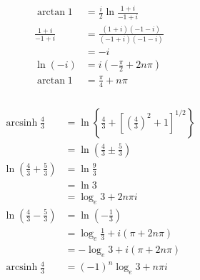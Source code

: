 \documentclass{article}
\newcommand{\arcsinh}{\operatorname{arcsinh}}
\begin{document}
\setcounter{subsubsection}{8}
\subsubsection{}

\begin{align*}
  \arctan 1            & = \frac{i}{2} \ln \frac{1 + i}{-1 + i}       \\
  \frac{1 + i}{-1 + i} & = \frac{(1 + i) (-1 - i)}{(-1 + i) (-1 - i)} \\
                       & = -i                                         \\
  \ln (-i)             & = i \left( -\frac{\pi}{2} + 2 n \pi \right)  \\
  \arctan 1            & = \frac{\pi}{4} + n \pi
\end{align*}

\setcounter{subsubsection}{10}
\subsubsection{}

\begin{align*}
  \arcsinh \frac{4}{3}                         & = \ln \left\{ \frac{4}{3} + \left[ \left( \frac{4}{3} \right)^2 + 1 \right]^{1 / 2} \right\} \\
                                               & = \ln \left( \frac{4}{3} \pm \frac{5}{3} \right)                                             \\
  \ln \left( \frac{4}{3} + \frac{5}{3} \right) & = \ln \frac{9}{3}                                                                            \\
                                               & = \ln 3                                                                                      \\
                                               & = \log_e 3 + 2 n \pi i                                                                       \\
  \ln \left( \frac{4}{3} - \frac{5}{3} \right) & = \ln \left( -\frac{1}{3} \right)                                                            \\
                                               & = \log_e \frac{1}{3} + i (\pi + 2 n \pi)                                                     \\
                                               & = -\log_e 3 + i (\pi + 2 n \pi)                                                              \\
  \arcsinh \frac{4}{3}                         & = (-1)^n \log_e 3 + n \pi i                                                                  \\
\end{align*}
\end{document}
